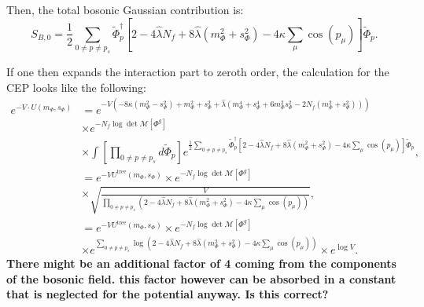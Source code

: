Then, the total bosonic Gaussian contribution is:
\begin{equation}\label{eq:CEP_alternative_bosonic_Gaussian_contribution}
 S_{B,0} = \frac{1}{2}  \sum\limits_{0\neq p \neq p_s}  \tilde\Phi_p^{\dagger}  
              \left[ 2 - 4 \hat\lambda N_f + 8 \hat\lambda \left( m_{\Phi}^2 + s_{\Phi}^2  \right) - 4 \kappa \sum_{\mu} \cos(p_{\mu}) \right]  \tilde\Phi_p.
\end{equation}

If one then expands the interaction part to zeroth order, the calculation for the CEP looks like the following:
\begin{align}\label{eq:deriv_of_bosDet_step1}
 e^{-V\cdot U(m_{\Phi}, s_{\Phi})} &= 
           e^{-V\left(
             -8 \kappa \left( m_{\Phi}^2 - s_{\Phi}^2 \right)  +  m_{\Phi}^2 + s_{\Phi}^2 
             + \hat\lambda \left( m_{\Phi}^4 + s_{\Phi}^4 + 6 m_{\Phi}^2s_{\Phi}^2 - 2 N_f \left(m_{\Phi}^2 + s_{\Phi}^2\right) \right) \right)} 
             \nonumber \\
             &\times e^{-N_f \log \det \mathcal{M}[\Phi^g]} 
             \nonumber \\
             &\times \int \left[\prod\limits_{0 \neq p \neq p_s}  d \tilde \Phi_p \right] 
              e^{ \frac{1}{2}  \sum\limits_{0\neq p \neq p_s}  \tilde\Phi_p^{\dagger}  
              \left[ 2 - 4 \hat\lambda N_f + 8 \hat\lambda \left( m_{\Phi}^2 + s_{\Phi}^2  \right) - 4 \kappa \sum_{\mu} \cos(p_{\mu}) \right]  \tilde\Phi_p}, 
          \\ \label{eq:deriv_of_bosDet_step2}
          &= e^{-V U^{\text{tree}}(m_{\Phi}, s_{\Phi})} \times e^{-N_f \log \det \mathcal{M}[\Phi^g]} 
          \nonumber \\
          & \times \sqrt{\frac{V}{\prod\limits_{0 \neq p \neq p_s} 
             \left(  2 - 4 \hat\lambda N_f + 8 \hat\lambda \left( m_{\Phi}^2 + s_{\Phi}^2  \right) - 4 \kappa \sum_{\mu} \cos(p_{\mu}) \right) }} ,
             \\\label{eq:deriv_of_bosDet_step3}
          &=  e^{-V U^{\text{tree}}(m_{\Phi}, s_{\Phi})} \times e^{-N_f \log \det \mathcal{M}[\Phi^g]} 
            \nonumber \\
          & \times e^{\sum\limits_{0 \neq p \neq p_s} 
          \log\left( 2 - 4 \hat\lambda N_f + 8 \hat\lambda \left( m_{\Phi}^2 + s_{\Phi}^2  \right) - 4 \kappa \sum_{\mu} \cos(p_{\mu}) \right)}
            \times e^{\log V}.
\end{align}
\textbf{There might be an additional factor of 4 coming from the components of the bosonic field. this factor however can be absorbed in a constant that 
is neglected for the potential anyway. Is this correct?}
